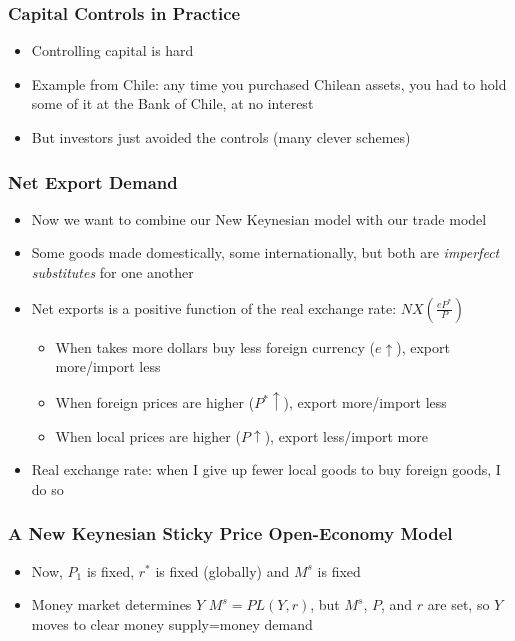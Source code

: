\documentclass{beamer}
\begin{document}
\begin{frame}
\frametitle[alignment=center]{Capital Controls in Practice}
\begin{itemize}
\item Controlling capital is hard
\bigskip
\item  Example from Chile:  any time you purchased Chilean assets, you had to hold some of it at the Bank of Chile, at no interest
\bigskip
\item But investors just avoided the controls (many clever schemes)
\end{itemize}
\end{frame}



\begin{frame}
\frametitle[alignment=center]{Net Export Demand}
\begin{itemize}
\item Now we want to combine our New Keynesian model with our trade model
\bigskip
\item Some goods made domestically, some internationally, but both are \emph{imperfect substitutes} for one another
\bigskip
\item Net exports is a positive function of the real exchange rate: $NX\left(\frac{eP^*}{P}\right)$
\begin{itemize}
\item When takes more dollars buy less foreign currency ($e\uparrow$), export more/import less
\bigskip
\item When foreign prices are higher  ($P^*\uparrow$), export more/import less
\bigskip
\item When local prices are higher ($P\uparrow$), export less/import more
\end{itemize}
\item Real exchange rate:  when I give up fewer local goods to buy foreign goods, I do so
\end{itemize}
\end{frame}

\begin{frame}
\frametitle[alignment=center]{A New Keynesian Sticky Price Open-Economy Model}
\begin{itemize}
\item Now, $P_1$ is fixed, $r^*$ is fixed (globally) and $M^s$ is fixed
\bigskip
\item Money market determines $Y$ $M^s=PL(Y,r)$, but $M^s$, $P$, and $r$ are set, so $Y$ moves to clear money supply=money demand
\end{itemize}
\end{frame}
\end{document}
